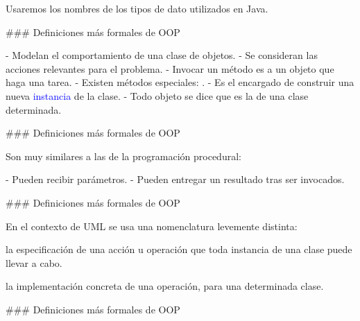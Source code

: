 \vfill

Usaremos los nombres de los tipos de dato utilizados en Java.

### Definiciones más formales de OOP

\newline

- Modelan el comportamiento de una clase de objetos.
- Se consideran las acciones relevantes para el problema.
- Invocar un método es  a un objeto que haga una tarea.
- Existen métodos especiales: .
    - Es el encargado de construir una nueva \textcolor{blue}{instancia} de la clase.
    - Todo objeto se dice que es la  de una clase determinada.

### Definiciones más formales de OOP

\newline

Son muy similares a las  de la programación procedural:

- Pueden recibir parámetros.
- Pueden entregar un resultado tras ser invocados.

### Definiciones más formales de OOP

\newline

En el contexto de UML se usa una nomenclatura levemente distinta:

\begin{description}[leftmargin=3em]
    \item[Operación:] la especificación de una acción
u operación que toda instancia de una clase puede llevar a cabo.
    \item[Método:] la implementación concreta de
una operación, para una determinada clase.
\end{description}

### Definiciones más formales de OOP


\vfill


